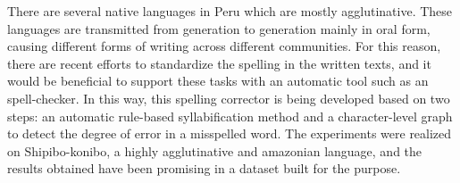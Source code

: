 There are several native languages in Peru which are mostly agglutinative. These languages are transmitted from generation to generation mainly in oral form, causing different forms of writing across different communities. For this reason, there are recent efforts to standardize the spelling in the written texts, and it would be beneficial to support these tasks with an automatic tool such as an spell-checker. In this way, this spelling corrector is being developed based on two steps: an automatic rule-based syllabification method and a character-level graph to detect the degree of error in a misspelled word. The experiments were realized on Shipibo-konibo, a highly agglutinative and amazonian language, and the results obtained have been promising in a dataset built for the purpose.
